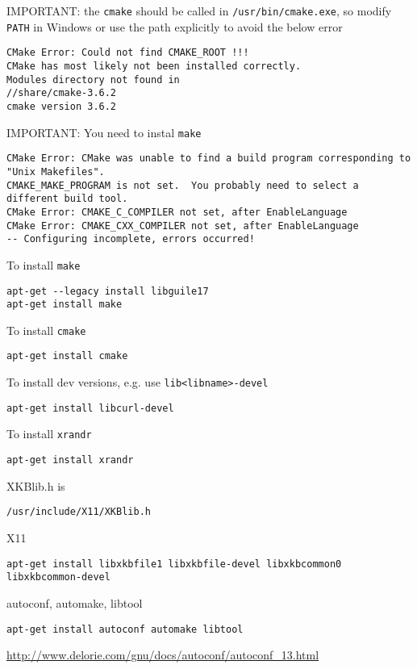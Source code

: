 IMPORTANT: the \verb!cmake! should be called in \verb!/usr/bin/cmake.exe!, so
modify \verb!PATH! in Windows or use the path explicitly to avoid the below
error

\begin{verbatim}
CMake Error: Could not find CMAKE_ROOT !!!
CMake has most likely not been installed correctly.
Modules directory not found in
//share/cmake-3.6.2
cmake version 3.6.2
\end{verbatim}


IMPORTANT: You need to instal \verb!make! 
\begin{verbatim}
CMake Error: CMake was unable to find a build program corresponding to "Unix Makefiles".  
CMAKE_MAKE_PROGRAM is not set.  You probably need to select a different build tool.
CMake Error: CMAKE_C_COMPILER not set, after EnableLanguage
CMake Error: CMAKE_CXX_COMPILER not set, after EnableLanguage
-- Configuring incomplete, errors occurred!
\end{verbatim}

To install \verb!make!
\begin{verbatim}
apt-get --legacy install libguile17 
apt-get install make
\end{verbatim}


To install \verb!cmake!
\begin{verbatim}
apt-get install cmake 
\end{verbatim}

To install dev versions, e.g. use \verb!lib<libname>-devel!
\begin{verbatim}
apt-get install libcurl-devel
\end{verbatim}

To install \verb!xrandr!
\begin{verbatim}
apt-get install xrandr	
\end{verbatim}

XKBlib.h is 
\begin{verbatim}
/usr/include/X11/XKBlib.h
\end{verbatim}

X11
\begin{verbatim}
apt-get install libxkbfile1 libxkbfile-devel libxkbcommon0 libxkbcommon-devel
\end{verbatim}

autoconf, automake, libtool
\begin{verbatim}
apt-get install autoconf automake libtool
\end{verbatim}
\url{http://www.delorie.com/gnu/docs/autoconf/autoconf_13.html}

